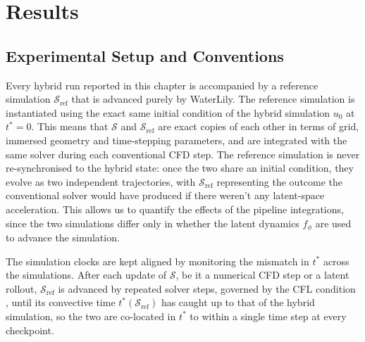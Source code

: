 \chapter{Results}
\label{chap: Results}


\section{Experimental Setup and Conventions}
\label{sect: 4_setup}

Every hybrid run reported in this chapter is accompanied by a reference simulation $\mathcal{S}_\text{ref}$ that is advanced purely by WaterLily. The reference simulation is instantiated using the exact same initial condition of the hybrid simulation $u_0$ at $t^*=0$. This means that $\mathcal{S}$ and $\mathcal{S}_\text{ref}$ are exact copies of each other in terms of grid, immersed geometry and time-stepping parameters, and are integrated with the same solver during each conventional CFD step. The reference simulation is never re-synchronised to the hybrid state: once the two share an initial condition, they evolve as two independent trajectories, with $\mathcal{S}_\text{ref}$ representing the outcome the conventional solver would have produced if there weren't any latent-space acceleration. This allows us to quantify the effects of the pipeline integrations, since the two simulations differ only in whether the latent dynamics $f_\phi$ are used to advance the simulation. 

The simulation clocks are kept aligned by monitoring the mismatch in $t^*$ across the simulations. After each update of $\mathcal{S}$, be it a numerical CFD step or a latent rollout, $\mathcal{S}_\text{ref}$ is advanced by repeated solver steps, governed by the CFL condition \cite{Weymouth2025}, until its convective time $t^*(\mathcal{S}_\text{ref})$ has caught up to that of the hybrid simulation, so the two are co-located in $t^*$ to within a single time step at every checkpoint.

